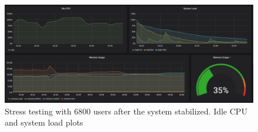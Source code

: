 \documentclass[oneside]{article}
\begin{document}
\begin{figure}[H]
  \centering
  \includegraphics[width=\textwidth]{ tests/6800-stable1.png }
  \caption{Stress testing with 6800 users after the system stabilized. Idle CPU and system load plots}
\end{figure}
\end{document}
